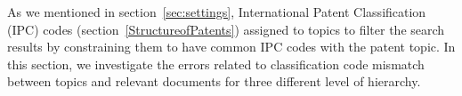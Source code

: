 
%
%
As we mentioned in section~\ref{sec:settings}, International Patent Classification (IPC) codes (section~\ref{StructureofPatents}) 
assigned to topics to filter the search results by constraining them to have common IPC codes with the patent topic.
In this section, we investigate the errors related to classification code mismatch between topics and relevant documents for three different level of hierarchy. 
 
